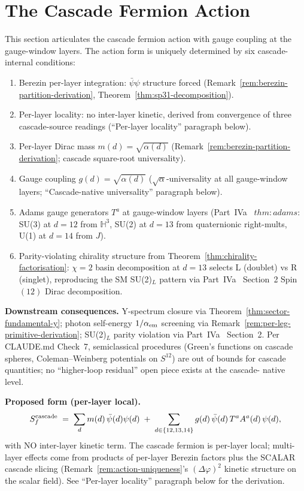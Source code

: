 \documentclass[12pt,a4paper]{article}
\begin{document}
\section{The Cascade Fermion Action}\label{sec:fermion-action}\label{rem:fermion-gauge-coupling}
This section articulates the cascade fermion action with gauge coupling
at the gauge-window layers. The action form is uniquely determined by
six cascade-internal conditions:
\begin{enumerate}[label=(F\arabic*),nosep]
\item Berezin per-layer integration: $\bar\psi\psi$ structure forced
(Remark~\ref{rem:berezin-partition-derivation}, Theorem~\ref{thm:sp31-decomposition}).
\item Per-layer locality: no inter-layer kinetic, derived from
convergence of three cascade-source readings (``Per-layer locality''
paragraph below).
\item Per-layer Dirac mass $m(d) = \sqrt{\alpha(d)}$
(Remark~\ref{rem:berezin-partition-derivation}; cascade square-root
universality).
\item Gauge coupling $g(d) = \sqrt{\alpha(d)}$ ($\sqrt{\alpha}$-universality
at all gauge-window layers; ``Cascade-native universality'' paragraph below).
\item Adams gauge generators $T^a$ at gauge-window layers (Part~IVa~\cite{part4a}
$\mathit{thm{:}adams}$: SU(3) at $d=12$ from $\mathbb{H}^3$, SU(2) at $d=13$
from quaternionic right-mults, U(1) at $d=14$ from $J$).
\item Parity-violating chirality structure from
Theorem~\ref{thm:chirality-factorisation}: $\chi=2$ basin decomposition
at $d=13$ selects L (doublet) vs R (singlet), reproducing the SM SU(2)$_L$
pattern via Part~IVa~\cite{part4a} Section~2 Spin$(12)$ Dirac decomposition.
\end{enumerate}

\medskip\noindent\textbf{Downstream consequences.}
Y-spectrum closure via Theorem~\ref{thm:sector-fundamental-y}; photon
self-energy $1/\alpha_{\rm em}$ screening via
Remark~\ref{rem:per-leg-primitive-derivation}; SU(2)$_L$ parity
violation via Part~IVa~\cite{part4a} Section~2. Per CLAUDE.md Check~7,
semiclassical procedures (Green's functions on cascade spheres,
Coleman--Weinberg potentials on $S^{12}$) are out of bounds for cascade
quantities; no ``higher-loop residual'' open piece exists at the cascade-
native level.

\medskip\noindent\textbf{Proposed form (per-layer local).}
\[
S_f^{\rm cascade} \;=\; \sum_d m(d)\,\bar\psi(d)\psi(d)
\;+\; \sum_{d\in\{12,13,14\}} g(d)\,\bar\psi(d)\,T^a A^a(d)\,\psi(d),
\]
with NO inter-layer kinetic term. The cascade fermion is per-layer
local; multi-layer effects come from products of per-layer Berezin
factors plus the SCALAR cascade slicing
(Remark~\ref{rem:action-uniqueness}'s $(\Delta\varphi)^2$ kinetic
structure on the scalar field). See ``Per-layer locality'' paragraph
below for the derivation.
\end{document}
